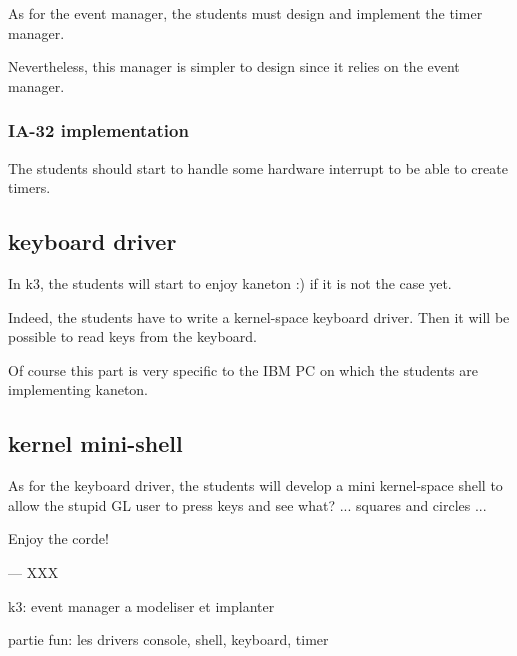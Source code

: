 As for the event manager, the students must design and implement the timer
manager.

Nevertheless, this manager is simpler to design since it relies on the
event manager.

\subsubsection{IA-32 implementation}

The students should start to handle some hardware interrupt to be able
to create timers.

\subsection{keyboard driver}

In k3, the students will start to enjoy kaneton :) if it is not the
case yet.

Indeed, the students have to write a kernel-space keyboard driver.
Then it will be possible to read keys from the keyboard.

Of course this part is very specific to the IBM PC on which the students
are implementing kaneton.

\subsection{kernel mini-shell}

As for the keyboard driver, the students will develop a mini kernel-space
shell to allow the stupid GL user to press keys and see what? ... squares
and circles ...

Enjoy the corde!

--- XXX

k3: event manager a modeliser et implanter

    partie fun: les drivers console, shell, keyboard, timer
